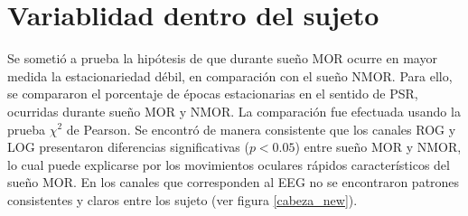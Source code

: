 \section{Variablidad dentro del sujeto}

Se sometió a prueba la hipótesis de que durante sueño MOR ocurre en mayor medida la estacionariedad
débil, en comparación con el sueño NMOR. Para ello, se compararon el porcentaje de épocas 
estacionarias en el sentido de PSR, ocurridas durante sueño MOR y NMOR. La comparación fue efectuada
usando la prueba $\chi^{2}$ de Pearson. Se encontró
de manera consistente que los canales ROG y LOG presentaron diferencias significativas ($p<0.05$) 
entre sueño MOR y NMOR, lo cual puede explicarse por los movimientos oculares rápidos característicos
del sueño MOR. En los canales que corresponden al EEG no se encontraron patrones consistentes y 
claros entre los sujeto (ver figura \ref{cabeza_new}).

